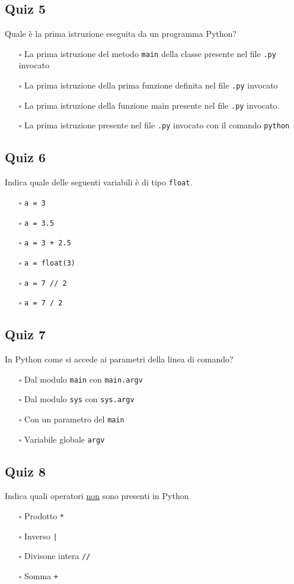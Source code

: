 \documentclass{article}
\begin{document}
\subsection*{Quiz 5}
Quale è la prima istruzione eseguita da un programma Python?
\begin{itemize}
  \item[$\square$] La prima istruzione del metodo \texttt{main} della classe presente nel file \texttt{.py} invocato
  \item[$\square$] La prima istruzione della prima funzione definita nel file \texttt{.py} invocato
  \item[$\square$] La prima istruzione della funzione main presente nel file \texttt{.py} invocato.
  \item[$\square$] La prima istruzione presente nel file \texttt{.py} invocato con il comando \texttt{python}
\end{itemize}
\subsection*{Quiz 6}
Indica quale delle seguenti variabili è di tipo \texttt{float}.
\begin{itemize}
  \item[$\square$] \texttt{a = 3}
  \item[$\square$] \texttt{a = 3.5}
  \item[$\square$] \texttt{a = 3 + 2.5}
  \item[$\square$] \texttt{a = float(3)}
  \item[$\square$] \texttt{a = 7 // 2}
  \item[$\square$] \texttt{a = 7 / 2}
\end{itemize}
\subsection*{Quiz 7}
In Python come si accede ai parametri della linea di comando?
\begin{itemize}
  \item[$\square$] Dal modulo \texttt{main} con \texttt{main.argv}
  \item[$\square$] Dal modulo \texttt{sys} con \texttt{sys.argv}
  \item[$\square$] Con un parametro del \texttt{main}
  \item[$\square$] Variabile globale \texttt{argv}
\end{itemize}
\subsection*{Quiz 8}
Indica quali operatori \underline{non} sono presenti in Python
\begin{itemize}
  \item[$\square$] Prodotto \texttt{*}
  \item[$\square$] Inverso \texttt{|}
  \item[$\square$] Divisone intera \texttt{//}
  \item[$\square$] Somma \texttt{+}
\end{itemize}
\end{document}
